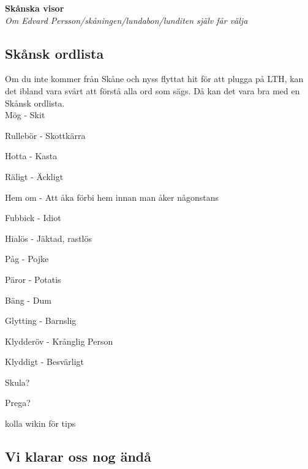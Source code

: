 \begin{center}
    \vspace*{1.5cm}
    {\fontsize{20}{20}\textbf{Skånska visor}}\\
    \vspace{0.7cm}
    {\fontsize{12}{12}\textit{Om Edvard Persson/skåningen/lundabon/lunditen själv får välja}}
\end{center}
\noBackground

\newpage
\resetBackground



\subsection*{Skånsk ordlista}

Om du inte kommer från Skåne och nyss flyttat hit för att plugga på LTH, 
kan det ibland vara svårt att förstå alla ord som sägs. Då kan det vara bra
med en Skånsk ordlista. \\



Mög - Skit

Rullebör - Skottkärra

Hotta - Kasta

Räligt - Äckligt

Hem om - Att åka förbi hem innan man åker någonstans

Fubbick - Idiot

Hialös - Jäktad, rastlös

Påg - Pojke

Päror - Potatis

Bäng - Dum

Glytting - Barnslig

Klydderöv - Krånglig Person

Klyddigt - Besvärligt

Skula?

Prega?

kolla wikin för tips

\newpage


\subsection*{Vi klarar oss nog ändå} 

